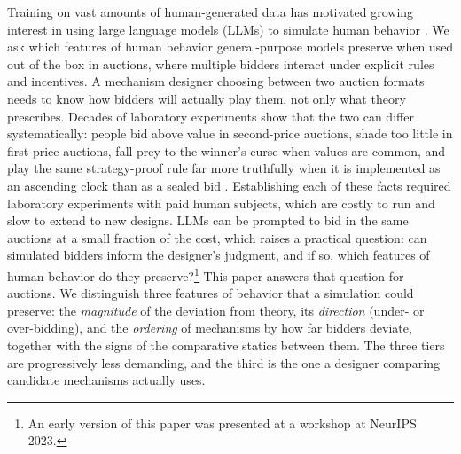\documentclass{article} %
\newif\ifmarkrev
\newcommand{\rev}[1]{\ifmarkrev\begingroup\color{red}#1\endgroup\else#1\fi}
\begin{document}
\rev{Training on vast amounts of human-generated data has motivated growing interest in using large language models (LLMs) to simulate human behavior \citep{aher2023using, horton2023large, manning2024automated}.
We ask which features of human behavior general-purpose models preserve when used out of the box in auctions, where multiple bidders interact under explicit rules and incentives.
A mechanism designer choosing between two auction formats needs to know how bidders will actually play them, not only what theory prescribes.
Decades of laboratory experiments show that the two can differ systematically: people bid above value in second-price auctions, shade too little in first-price auctions, fall prey to the winner's curse when values are common, and play the same strategy-proof rule far more truthfully when it is implemented as an ascending clock than as a sealed bid \citep{kagel1993independent, kagel1986winner, li2017obviously, breitmoser2022obviousness}.
Establishing each of these facts required laboratory experiments with paid human subjects, which are costly to run and slow to extend to new designs.
LLMs can be prompted to bid in the same auctions at a small fraction of the cost, which raises a practical question: can simulated bidders inform the designer's judgment, and if so, which features of human behavior do they preserve?\footnote{An early version of this paper was presented at a workshop at NeurIPS 2023.}
This paper answers that question for auctions.
We distinguish three features of behavior that a simulation could preserve: the \emph{magnitude} of the deviation from theory, its \emph{direction} (under- or over-bidding), and the \emph{ordering} of mechanisms by how far bidders deviate, together with the signs of the comparative statics between them.
The three tiers are progressively less demanding, and the third is the one a designer comparing candidate mechanisms actually uses.}
\end{document}
